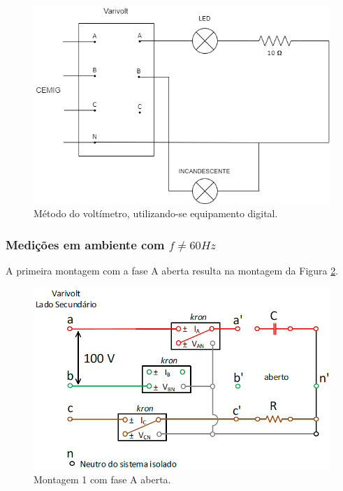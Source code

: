 \documentclass[a4paper,12pt,oneside,openany,table,xcdraw]{article}
\begin{document}
\vspace{2cm}
\begin{figure}[H]
\centering
\includegraphics[width=13cm]{m1-circuito}
\caption{Método do voltímetro, utilizando-se equipamento digital.}
\label{m1:esquema}
\end{figure}

\newpage
\subsubsection{Medições em ambiente com $f\ne 60Hz$}
A primeira montagem com a fase A aberta resulta na montagem da Figura \ref{m2:esquema}.
\vspace{0.3cm}
\begin{figure}[H]
\centering
\includegraphics[width=13cm]{m2-circuito}
\caption{Montagem 1 com fase A aberta.}
\label{m2:esquema}
\end{figure}
\vspace{0.1cm}
\end{document}
